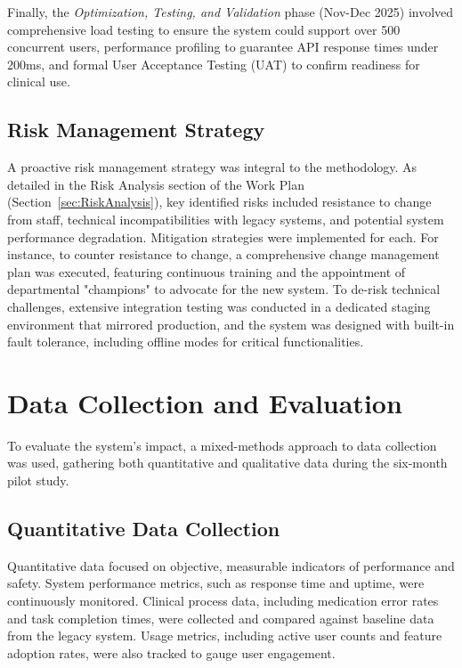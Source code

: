 Finally, the \textit{Optimization, Testing, and Validation} phase (Nov-Dec 2025) involved comprehensive load testing to ensure the system could support over 500 concurrent users, performance profiling to guarantee API response times under 200ms, and formal User Acceptance Testing (UAT) to confirm readiness for clinical use.

\subsection{Risk Management Strategy}

A proactive risk management strategy was integral to the methodology. As detailed in the Risk Analysis section of the Work Plan (Section~\ref{sec:RiskAnalysis}), key identified risks included resistance to change from staff, technical incompatibilities with legacy systems, and potential system performance degradation. Mitigation strategies were implemented for each. For instance, to counter resistance to change, a comprehensive change management plan was executed, featuring continuous training and the appointment of departmental "champions" to advocate for the new system. To de-risk technical challenges, extensive integration testing was conducted in a dedicated staging environment that mirrored production, and the system was designed with built-in fault tolerance, including offline modes for critical functionalities.

\section{Data Collection and Evaluation}

To evaluate the system's impact, a mixed-methods approach to data collection was used, gathering both quantitative and qualitative data during the six-month pilot study.

\subsection{Quantitative Data Collection}
Quantitative data focused on objective, measurable indicators of performance and safety. System performance metrics, such as response time and uptime, were continuously monitored. Clinical process data, including medication error rates and task completion times, were collected and compared against baseline data from the legacy system. Usage metrics, including active user counts and feature adoption rates, were also tracked to gauge user engagement.

